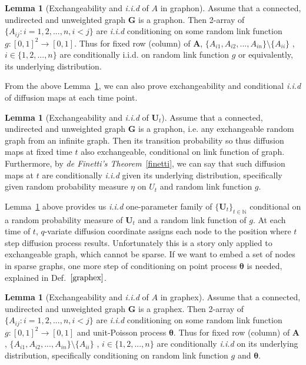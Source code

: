 \documentclass[12pt]{article}
\theoremstyle{definition}
\newtheorem{lemma}[theorem]{Lemma}
\begin{document}
\begin{lemma}[Exchangeability and \textit{i.i.d} of $A$ in graphon]
	\label{lemma_graphon}
Assume that a connected, undirected and unweighted graph $\mathbf{G}$ is a graphon. Then 2-array of $\{ A_{ij} : i = 1,2,... ,n , i < j \}$ are  \textit{i.i.d} conditioning on some random link function $g : [0,1]^2 \rightarrow [0,1]$. Thus for fixed row (column) of $\mathbf{A}$, $\{ A_{i1}, A_{i2}, ... , A_{in} \} \setminus \{ A_{ii} \} $ , $i \in \{ 1,2,... , n \}$ are conditionally i.i.d. on random link function $g$ or equivalently, its underlying distribution.  
\end{lemma}
		
From the above Lemma~\ref{lemma_graphon}, we can also prove exchangeability and conditional \textit{i.i.d} of diffusion maps at each time point. 
	
\begin{lemma}[Exchangeability and \textit{i.i.d} of $\mathbf{U}_{t}$]
	\label{main_lemma}
	Assume that a connected, undirected and unweighted graph $\mathbf{G}$ is a graphon, i.e. any exchangeable random graph from an infinite graph. Then its transition probability so thus diffusion maps at fixed time $t$ also exchangeable, conditional on link function of graph. Furthermore, by \textit{de Finetti's Theorem}~\ref{finetti}, we can say that such diffusion maps at $t$ are conditionally \textit{i.i.d} given its underlying distribution, specifically given random probability measure $\eta$ on $U_{t}$ and random link function $g$.    
\end{lemma}
	
Lemma~\ref{main_lemma} above provides us \textit{i.i.d} one-parameter family of $\{ \mathbf{U}_{t} \}_{t \in \mathbb{N}}$ conditional on a random probability measure of $\mathbf{U}_{t}$ and a random link function of $g$. At each time of $t$,  $q$-variate diffusion coordinate assigns each node to the position where $t$ step diffusion process results. Unfortunately this is a story only applied to exchangeable graph, which cannot be sparse. If we want to embed a set of nodes in sparse graphs, one more step of conditioning on point process $\mathbf{\theta}$ is needed, explained in Def.~$\ref{graphex}$.  
	
	
\begin{lemma}[Exchangeability and \textit{i.i.d} of $A$ in graphex]
\label{lemma_graphex}
Assume that a connected, undirected and unweighted graph $\mathbf{G}$ is a graphex. Then 2-array of $\{ A_{ij} : i = 1,2,... ,n , i < j \}$ are  \textit{i.i.d} conditioning on some random link function $g : [0,1]^2 \rightarrow [0,1]$ and unit-Poisson process $\mathbf{\theta}$. Thus for fixed row (column) of $\mathbf{A}$, $\{ A_{i1}, A_{i2}, ... , A_{in} \} \setminus \{ A_{ii} \} $ , $i \in \{ 1,2,... , n \}$ are conditionally \textit{i.i.d} on its underlying distribution, specifically conditioning on random link function $g$ and $\mathbf{\theta}$.  
\end{lemma}	
\end{document}
